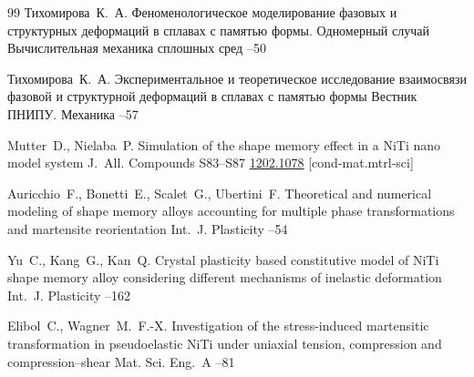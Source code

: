 \begin{thebibliography}{99}
\by Тихомирова~К.~А.
\paper Феноменологическое моделирование фазовых и структурных деформаций в сплавах с памятью формы. Одномерный случай
\jour Вычислительная механика сплошных сред
--50

\by Тихомирова~К.~А.
\paper Экспериментальное и теоретическое исследование взаимосвязи фазовой и структурной деформаций в сплавах с памятью формы
\jour Вестник ПНИПУ. Механика
--57

\by Mutter~D., Nielaba~P.
\paper Simulation of the shape memory effect in a NiTi nano model system
\jour J.~All. Compounds
\issue 
\pages S83--S87
\arxiv  	\href{https://arxiv.org/abs/1202.1078}{1202.1078} [cond-mat.mtrl-sci]

\by Auricchio~F., Bonetti~E., Scalet~G., Ubertini~F.
\paper Theoretical and numerical modeling of shape memory alloys accounting for multiple phase transformations and martensite reorientation
\jour Int.~J. Plasticity
--54

\by Yu~C., Kang~G., Kan~Q.
\paper Crystal plasticity based constitutive model of NiTi shape memory alloy considering different mechanisms of inelastic deformation
\jour Int.~J. Plasticity
--162

\by Elibol~C., Wagner~M.~F.-X.
\paper Investigation of the stress-induced martensitic transformation in pseudoelastic NiTi under uniaxial tension, compression and compression–shear
\jour Mat. Sci. Eng.~A
--81


\end{thebibliography}
